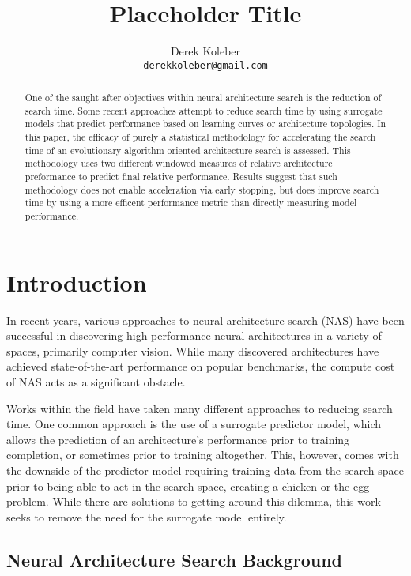 \documentclass[twocolumn]{article}
\title{Placeholder Title}
\author{%
  Derek Koleber \\
  \texttt{derekkoleber@gmail.com}  
}
\begin{document}
\maketitle

\begin{abstract}
    One of the saught after objectives within neural architecture search
    is the reduction of search time. Some recent approaches attempt to reduce
    search time by using surrogate models that predict performance
    based on learning curves or architecture topologies. 
    In this paper, the efficacy of purely a statistical methodology for accelerating
    the search time of an evolutionary-algorithm-oriented architecture search is assessed. 
    This methodology uses two different windowed measures of relative architecture preformance
    to predict final relative performance.
    Results suggest that such methodology does not enable acceleration via early stopping, 
    but does improve search time by using a more efficent performance metric than directly measuring model performance.
\end{abstract}

\section{Introduction}

In recent years, various approaches to neural architecture search (NAS) have been 
successful in discovering high-performance neural architectures in a variety of spaces, primarily computer vision.
While many discovered architectures have achieved state-of-the-art performance on popular benchmarks, the compute cost of NAS acts as a significant obstacle.

Works within the field have taken many different approaches to reducing search time.
One common approach is the use of a surrogate predictor model,
which allows the prediction of an architecture's performance prior to training completion, or sometimes prior to training altogether.
This, however, comes with the downside of the predictor model requiring training data from the search space prior to being able to 
act in the search space, creating a chicken-or-the-egg problem.
While there are solutions to getting around this dilemma, this work seeks to remove the need for the surrogate model entirely.

\subsection {Neural Architecture Search Background}
\end{document}
